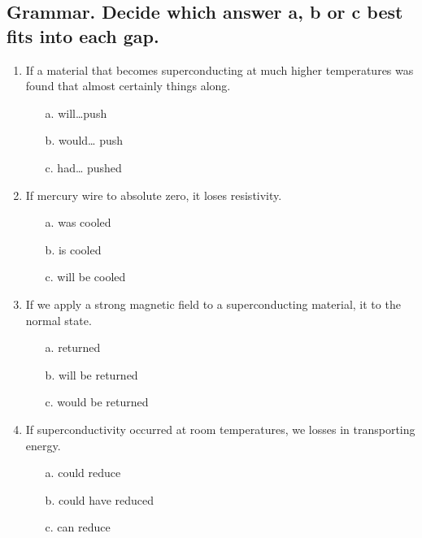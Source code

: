 \subsection*{Grammar. Decide which answer a, b or c best fits into each gap.}
\begin{enumerate}
      \item If a material that becomes superconducting at much higher temperatures was found that \underline{\hspace{2cm}} almost certainly \underline{\hspace{2cm}} things along.
            \begin{enumerate}
                  \item[a.] will…push
                  \item[b.] would… push
                  \item[c.] had… pushed
            \end{enumerate}

      \item If mercury wire \underline{\hspace{2cm}} to absolute zero, it loses resistivity.
            \begin{enumerate}
                  \item[a.] was cooled
                  \item[b.] is cooled
                  \item[c.] will be cooled
            \end{enumerate}

      \item If we apply a strong magnetic field to a superconducting material, it \underline{\hspace{2cm}} to the normal state.
            \begin{enumerate}
                  \item[a.] returned
                  \item[b.] will be returned
                  \item[c.] would be returned
            \end{enumerate}

      \item If superconductivity occurred at room temperatures, we \underline{\hspace{2cm}} losses in transporting energy.
            \begin{enumerate}
                  \item[a.] could reduce
                  \item[b.] could have reduced
                  \item[c.] can reduce
            \end{enumerate}


\end{enumerate}
